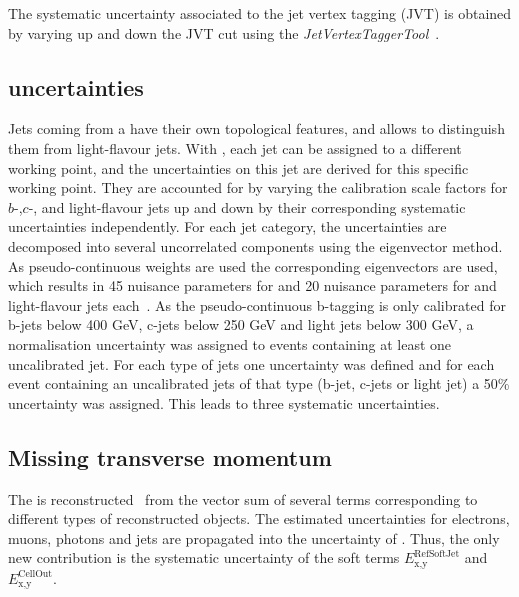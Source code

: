 The systematic uncertainty associated to the jet vertex tagging (JVT) is obtained by varying up and down the JVT cut using the \emph{JetVertexTaggerTool}~\cite{ATLAS-CONF-2014-018}. 


\subsection*{\btag uncertainties}

Jets coming from a \bquarks have their own topological features, and \btag allows to distinguish them from light-flavour jets. With \emph{\btag}, each jet can be assigned to a different working point, and the \btag uncertainties on this jet are derived for this specific working point. They are accounted for by varying the calibration scale factors for \ensuremath{b}-,\ensuremath{c}-, and light-flavour jets up and down by their corresponding systematic uncertainties independently. For each jet category, the uncertainties are decomposed into several uncorrelated components using the eigenvector method. As pseudo-continuous \btag weights are used the corresponding eigenvectors are used, which results in 45 nuisance parameters for \bjets and 20 nuisance parameters for \cjets and light-flavour jets each~\cite{ATL-PHYS-PUB-2017-013}.
As the pseudo-continuous b-tagging is only calibrated for b-jets below 400 GeV, c-jets below 250 GeV and light jets below 300 GeV, a normalisation uncertainty was assigned to events containing at least one uncalibrated jet. For each type of jets one uncertainty was defined and for each event containing an uncalibrated jets of that type (b-jet, c-jets or light jet) a 50\% uncertainty was assigned. This leads to three systematic uncertainties.

\subsection*{Missing transverse momentum}

The \met is reconstructed~\cite{ATLAS-CONF-2018-023} from the vector sum of several terms corresponding to different types of reconstructed objects. The estimated uncertainties for electrons, muons, photons and jets are propagated into the uncertainty of \met. Thus, the only new contribution is the systematic uncertainty of the soft terms $E_{\text{x,y}}^{\text{RefSoftJet}}$ and $E_{\text{x,y}}^{\text{CellOut}}$.

